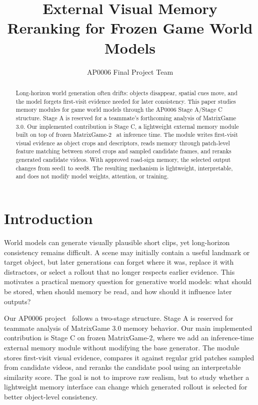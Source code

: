 \documentclass[10pt,twocolumn,letterpaper]{article}
\title{External Visual Memory Reranking for Frozen Game World Models}
\author{AP0006 Final Project Team}
\begin{document}
\maketitle

\begin{abstract}
Long-horizon world generation often drifts: objects disappear, spatial cues move, and the model forgets first-visit evidence needed for later consistency. This paper studies memory modules for game world models through the AP0006 Stage A/Stage C structure. Stage A is reserved for a teammate's forthcoming analysis of MatrixGame 3.0. Our implemented contribution is Stage C, a lightweight external memory module built on top of frozen MatrixGame-2~\cite{matrixgame} at inference time. The module writes first-visit visual evidence as object crops and descriptors, reads memory through patch-level feature matching between stored crops and sampled candidate frames, and reranks generated candidate videos. With approved road-sign memory, the selected output changes from seed1 to seed8. The resulting mechanism is lightweight, interpretable, and does not modify model weights, attention, or training.
\end{abstract}

\section{Introduction}
World models can generate visually plausible short clips, yet long-horizon consistency remains difficult. A scene may initially contain a useful landmark or target object, but later generations can forget where it was, replace it with distractors, or select a rollout that no longer respects earlier evidence. This motivates a practical memory question for generative world models: what should be stored, when should memory be read, and how should it influence later outputs?

Our AP0006 project~\cite{worldmodelrepo} follows a two-stage structure. Stage A is reserved for teammate analysis of MatrixGame 3.0 memory behavior. Our main implemented contribution is Stage C on frozen MatrixGame-2, where we add an inference-time external memory module without modifying the base generator. The module stores first-visit visual evidence, compares it against regular grid patches sampled from candidate videos, and reranks the candidate pool using an interpretable similarity score. The goal is not to improve raw realism, but to study whether a lightweight memory interface can change which generated rollout is selected for better object-level consistency.
\end{document}
